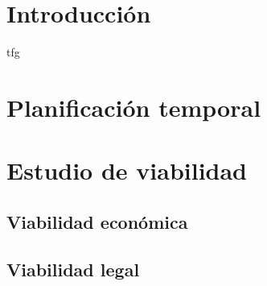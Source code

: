 
\section{Introducción}
\acrfull{tfg}

\section{Planificación temporal}

\section{Estudio de viabilidad}

\subsection{Viabilidad económica}

\subsection{Viabilidad legal}


